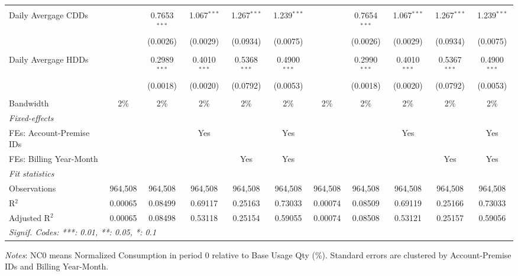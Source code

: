 \begin{table}[htbp]
\begin{adjustbox}{scale = 0.75}
\begin{tabular}{lcccccccccc}
&   &   &   &   &   &   &   &   &   &  \\
Daily Avergage CDDs&   & 0.7653$^{***}$ & 1.067$^{***}$ & 1.267$^{***}$ & 1.239$^{***}$ &    & 0.7654$^{***}$ & 1.067$^{***}$ & 1.267$^{***}$ & 1.239$^{***}$\\
  &   & (0.0026) & (0.0029) & (0.0934) & (0.0075) &    & (0.0026) & (0.0029) & (0.0934) & (0.0075)\\
&   &   &   &   &   &   &   &   &   &  \\
Daily Avergage HDDs&   & 0.2989$^{***}$ & 0.4010$^{***}$ & 0.5368$^{***}$ & 0.4900$^{***}$ &    & 0.2990$^{***}$ & 0.4010$^{***}$ & 0.5367$^{***}$ & 0.4900$^{***}$\\
  &   & (0.0018) & (0.0020) & (0.0792) & (0.0053) &    & (0.0018) & (0.0020) & (0.0792) & (0.0053)\\
&   &   &   &   &   &   &   &   &   &  \\
\midrule Bandwidth & 2\% & 2\% & 2\% & 2\% & 2\% & 2\% & 2\% & 2\% & 2\% & 2\%\\
\midrule
\emph{Fixed-effects}&   &   &   &   &   &   &   &   &   &  \\
FEs: Account-Premise IDs &  &  & Yes &  & Yes &  &  & Yes &  & Yes\\
FEs: Billing Year-Month &  &  &  & Yes & Yes &  &  &  & Yes & Yes\\
\midrule
\emph{Fit statistics}&  & & & & & & & & & \\
Observations & 964,508&964,508&964,508&964,508&964,508&964,508&964,508&964,508&964,508&964,508\\
R$^2$ & 0.00065&0.08499&0.69117&0.25163&0.73033&0.00074&0.08509&0.69119&0.25166&0.73033\\
Adjusted R$^2$ & 0.00065&0.08498&0.53118&0.25154&0.59055&0.00074&0.08508&0.53121&0.25157&0.59056\\
\bottomrule\bottomrule
\multicolumn{11}{l}{\emph{Signif. Codes: ***: 0.01, **: 0.05, *: 0.1}}\\
\end{tabular}
\end{adjustbox}
\begin{tablenotes}
\footnotesize
\emph{\medskip Notes}: NC0 means Normalized Consumption in period 0 relative to Base Usage Qty (\%). Standard errors are clustered by Account-Premise IDs and Billing Year-Month.
\end{tablenotes}
\end{table}